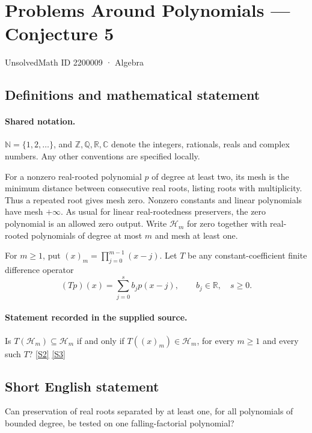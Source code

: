 \documentclass[11pt]{article}
\newcommand{\sref}[2]{\hyperlink{source:#1:#2}{[S#2]}}
\begin{document}
\setcounter{section}{2200008}
\section{Problems Around Polynomials — Conjecture 5}\label{2200009}
{\small\sffamily UnsolvedMath ID 2200009 · Algebra}
\subsection{Definitions and mathematical statement}

\paragraph{Shared notation.}$\mathbb N=\{1,2,\ldots\}$, and $\mathbb Z,\mathbb Q,\mathbb R,\mathbb C$ denote the integers, rationals, reals and complex numbers. Any other conventions are specified locally.


For a nonzero real-rooted polynomial $p$ of degree at least two, its mesh is the minimum distance between consecutive real roots, listing roots with multiplicity. Thus a repeated root gives mesh zero. Nonzero constants and linear polynomials have mesh $+\infty$. As usual for linear real-rootedness preservers, the zero polynomial is an allowed zero output. Write $\mathcal H_m$ for zero together with real-rooted polynomials of degree at most $m$ and mesh at least one.\par For $m\geq1$, put $(x)_m=\prod_{j=0}^{m-1}(x-j)$. Let $T$ be any constant-coefficient finite difference operator
\[(Tp)(x)=\sum_{j=0}^s b_jp(x-j),\qquad b_j\in\mathbb R,\quad s\geq0.\]
\paragraph{Statement recorded in the supplied source.}
Is $T(\mathcal H_m)\subseteq\mathcal H_m$ if and only if $T((x)_m)\in\mathcal H_m$, for every $m\geq1$ and every such $T$? \sref{2200009}{2} \sref{2200009}{3}
\subsection{Short English statement}
Can preservation of real roots separated by at least one, for all polynomials of bounded degree, be tested on one falling-factorial polynomial?
\end{document}

